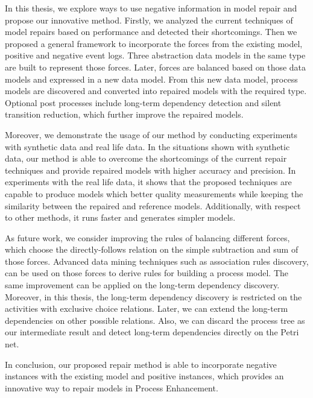 
In this thesis, we explore ways to use negative information in model repair and propose our innovative method. Firstly, we analyzed the current techniques of model repairs based on performance and detected their shortcomings. Then we  proposed a general framework to incorporate the forces from the existing model, positive and negative event logs. Three abstraction data models in the same type are built to represent those forces. Later, forces are balanced based on those data models and expressed in a new data model. From this new data model, process models are discovered and converted into repaired models with the required type. Optional post processes include long-term dependency detection and silent transition reduction, which further improve the repaired models. 

Moreover, we demonstrate the usage of our method by conducting experiments with synthetic data and real life data. In the situations shown with synthetic data,  our method is able to overcome the shortcomings of the current repair techniques and provide repaired models with higher accuracy and precision. In experiments with the real life data, it shows that the proposed techniques are capable to produce models which better quality measurements while keeping the similarity between the repaired and reference models. Additionally, with respect to other methods, it runs faster and generates simpler models. 

As future work, we consider improving the rules of balancing different forces, which choose the directly-follows relation on the simple subtraction and sum of those forces. Advanced data mining techniques such as association rules discovery, can be used on those forces to derive rules for building a process model. The same improvement can be applied on the long-term dependency discovery. Moreover, in this thesis, the long-term dependency discovery is restricted on the activities with exclusive choice relations. Later, we can extend the long-term dependencies on other possible relations. Also, we can discard the process tree as our intermediate result and detect long-term dependencies directly on the Petri net. 

In conclusion, our proposed repair method is able to incorporate negative instances with the existing model and positive instances, which provides an innovative way to repair models in Process Enhancement. 
